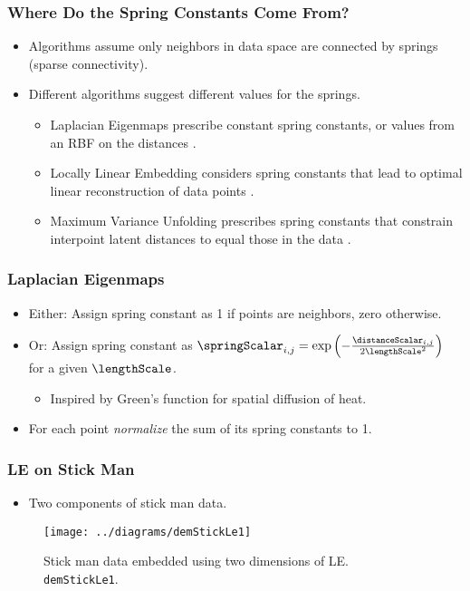 \subsubsection{Where Do the Spring Constants Come From?}
\begin{itemize}
\item Algorithms assume only neighbors in data space are connected by springs (sparse connectivity).
\item Different algorithms suggest different values for the springs.
  \begin{itemize}
  \item Laplacian Eigenmaps prescribe constant spring constants, or values from an RBF on the distances {\scriptsize \citep{Belkin:laplacian03}}.
  \item Locally Linear Embedding considers spring constants that lead to optimal linear reconstruction of data points {\scriptsize \citep{Roweis:lle00}}.
  \item Maximum Variance Unfolding prescribes spring constants that constrain interpoint latent distances to equal those in the data {\scriptsize \citep{Weinberger:learning04}}.
  \end{itemize}
\end{itemize}



\subsubsection{Laplacian Eigenmaps}
\begin{itemize}
\item Either: Assign spring constant as 1 if points are neighbors, zero otherwise.
\item Or: Assign spring constant as $\springScalar_{i,j} =
  \exp\left(-\frac{\distanceScalar_{i,j}}{2 \lengthScale^2}\right)$
  for a given $\lengthScale$.
  \begin{itemize}
  \item Inspired by Green's function for spatial diffusion of heat.
  \end{itemize}
\item For each point \emph{normalize} the sum of its spring
  constants to 1.
\end{itemize}  




\subsubsection{LE on Stick Man}
\begin{itemize}
\item Two components of stick man data.
\end{itemize}
\begin{figure}
  \begin{center}
    \texttt{[image: ../diagrams/demStickLe1]}
    \caption{Stick man data embedded using two dimensions of LE. \texttt{demStickLe1}.}
  \end{center}
\end{figure}



